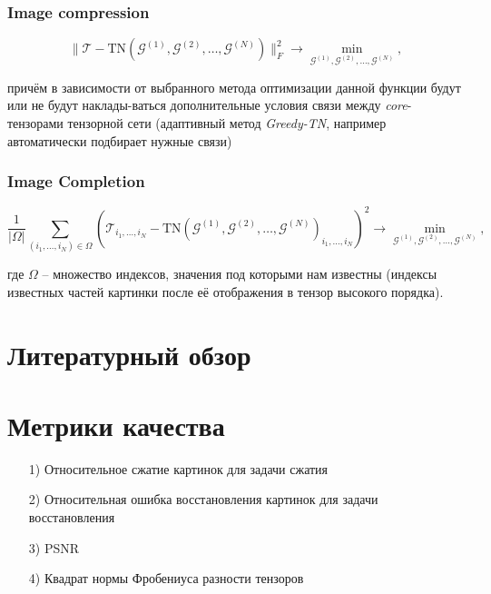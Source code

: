 \documentclass[]{scrartcl}
\begin{document}
\subsubsection{Image compression}
\begin{equation}\label{ImComprProbStatement}
\|\mathcal{T} - \text{TN}(\mathcal{G}^{(1)}, \mathcal{G}^{(2)}, \dots, \mathcal{G}^{(N)})\|_F^2 \to \min\limits_{\mathcal{G}^{(1)}, \mathcal{G}^{(2)}, \dots, \mathcal{G}^{(N)}},
\end{equation}


причём в зависимости от выбранного метода оптимизации данной функции будут или не будут наклады-ваться дополнительные условия связи между \textit{core}-тензорами тензорной сети (адаптивный метод \textit{Greedy-TN}, например автоматически подбирает нужные связи)

\subsubsection{Image Completion}
\begin{equation}\label{ImComplProbStatement}
\frac{1}{|\Omega|}\sum\limits_{(i_1, \dots, i_N) \in \Omega}\left(\mathcal{T}_{i_1, \dots, i_N} - \text{TN}(\mathcal{G}^{(1)}, \mathcal{G}^{(2)}, \dots, \mathcal{G}^{(N)})_{i_1, \dots, i_N}\right)^2 \to \min\limits_{\mathcal{G}^{(1)}, \mathcal{G}^{(2)}, \dots, \mathcal{G}^{(N)}},
\end{equation}

где $\Omega$ -- множество индексов, значения под которыми нам известны (индексы известных частей картинки после её отображения в тензор высокого порядка).

\newpage
\section{Литературный обзор}

\newpage




\section{Метрики качества}
\begin{enumerate}
    \item[1)] Относительное сжатие картинок для задачи сжатия
    \item[2)] Относительная ошибка восстановления картинок для задачи восстановления 
    \item[3)] PSNR
    \item[4)] Квадрат нормы Фробениуса разности тензоров
\end{enumerate}
\end{document}
